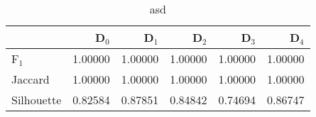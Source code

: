 \begin{table}
\centering
\caption{asd}
\label{tab:s1-orig-splitmerge-single}
\begin{tabular}{lrrrrr}
\toprule
{} &   D$_0$ &   D$_1$ &   D$_2$ &   D$_3$ &   D$_4$ \\
\midrule
F$_1$      & 1.00000 & 1.00000 & 1.00000 & 1.00000 & 1.00000 \\
Jaccard    & 1.00000 & 1.00000 & 1.00000 & 1.00000 & 1.00000 \\
Silhouette & 0.82584 & 0.87851 & 0.84842 & 0.74694 & 0.86747 \\
\bottomrule
\end{tabular}
\end{table}

